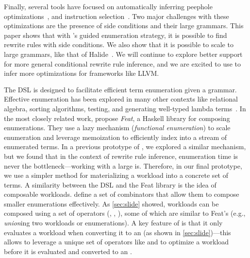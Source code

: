 Finally, several tools have focused on automatically inferring
  peephole optimizations~\citep{bansal, alive, fraser, optgen}, and
  instruction selection~\citep{buchwald}.
Two major challenges with these optimizations
  are the presence of side conditions
  and their large grammars.
This paper shows that
  with \enumo's guided enumeration strategy,
  it is possible to find rewrite rules with 
  side conditions.
  We also show that it is possible to
  scale to
  large grammars, like that of Halide~\citep{halide}.
We will continue to explore
  better support for more general conditional
  rewrite rule inference,
  and we are excited to use \enumo
  to infer more optimizations for frameworks like LLVM.

The \enumo DSL is designed to facilitate
  efficient term enumeration given a grammar.
Effective enumeration has been explored in many other contexts like
  relational algebra, sorting algorithms, testing, and generating well-typed
  lambda terms~\citep{alice, icfp16, feat, flajolet, welltyped}.
In the most closely related work, \citet{feat}
  propose \textit{Feat}, a Haskell library for composing enumerations.
They use a lazy mechanism (\textit{functional enumeration})
  to scale enumeration and leverage memoization to efficiently index into a stream
  of enumerated terms.
In a previous prototype of \enumo, we explored a similar mechanism,
  but we found that in the context of rewrite rule inference,
  enumeration time is never the bottleneck---working
  with a large \egraph is.
Therefore, in our final prototype, we use a simpler method for materializing
  a workload into a concrete set of terms.
A similarity between the \enumo DSL and
  the Feat library is the idea of
  composable workloads.
\citet{feat} define a set of combinators that
  allow them to compose smaller
  enumerations effectively.
As \autoref{sec:slide} showed,
  \enumo workloads
  can be composed using
  a set of operators (\Plug, \Filter, \Union), some of which
  are similar to Feat's (e.g., \textit{union}ing two workloads or enumerations).
A key feature of \enumo is that it
  only evaluates a workload when
  converting it to an \egraph (as shown in \autoref{sec:slide})---this
  allows \enumo to leverage a unique set of operators like
   and  to
  optimize a workload before it is evaluated
  and converted to an \egraph.

